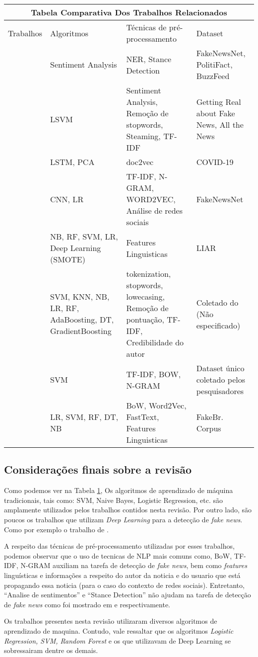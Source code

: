 \begin{table}
 \label{table:tablecomparativa1}
\begin{tabular}{ |p{3cm}||p{3cm}|p{3cm}|p{3cm}|  }
 \hline
 \multicolumn{4}{|c|}{Tabela Comparativa Dos Trabalhos Relacionados} \\
 \hline
 Trabalhos& Algoritmos & Técnicas de pré-processamento&Dataset\\
 \hline
 \citet{parikh2019}   &  Sentiment Analysis   & NER, Stance Detection & FakeNewsNet, PolitiFact, BuzzFeed  \\
 \citet{baarir2020}&   LSVM  & Sentiment Analysis, Remoção de stopwords, Steaming, TF-IDF   & Getting Real about Fake News, All the News \\
 \citet{DeMagistris2022} & LSTM, PCA & doc2vec & COVID-19  \\
 \citet{Wu2021530}  & CNN, LR & TF-IDF, N-GRAM, WORD2VEC, Análise de redes sociais  & FakeNewsNet \\
 \citet{Mouratidis20211}& NB, RF, SVM, LR, Deep Learning (SMOTE)    & Features Linguisticas & LIAR \\
 \citet{SelvaBirunda2021406}&  SVM, KNN, NB, LR, RF, AdaBoosting, DT, GradientBoosting & tokenization, stopwords, lowecasing, Remoção de pontuação, TF-IDF, Credibilidade do autor & Coletado do \cite{kaggle} (Não especificado)\\
 \citet{Setiawan2021}& SVM  & TF-IDF, BOW, N-GRAM & Dataset único coletado pelos pesquisadores \\
 \citet{Silva2020}&  LR, SVM, RF, DT, NB  & BoW, Word2Vec, FastText, Features Linguisticas & FakeBr. Corpus\\
 \hline
\end{tabular}
\end{table}

\subsection{Considerações finais sobre a revisão}

Como podemos ver na Tabela \ref{table:tablecomparativa1}, Os algoritmos de aprendizado de máquina tradicionais, tais como: SVM, Naive Bayes, Logistic Regression, etc. são amplamente utilizados pelos trabalhos contidos nesta revisão. Por outro lado, são poucos os trabalhos que utilizam \textit{Deep Learning} para a detecção de \textit{fake news}. Como por exemplo o trabalho de \citet{Mouratidis20211}.

A respeito das técnicas de pré-processamento utilizadas por esses trabalhos, podemos observar que o uso de tecnicas de NLP mais comuns como, BoW, TF-IDF, N-GRAM auxiliam na tarefa de detecção de \textit{fake news}, bem como \textit{features} linguísticas e informações a respeito do autor da noticia e do usuario que está propagando essa noticia (para o caso do contexto de redes sociais).  Entretanto, ``Analise de sentimentos'' e ``Stance Detection''  não ajudam na tarefa de detecção de \textit{fake news} como foi mostrado em \citet{baarir2020} e \citet{DeMagistris2022} respectivamente. 

Os trabalhos presentes nesta revisão utilizaram diversos algoritmos de aprendizado de maquina. Contudo, vale ressaltar que os algoritmos \textit{Logistic Regression, SVM, Random Forest} e os que utilizavam de Deep Learning se sobressairam dentre os demais.



